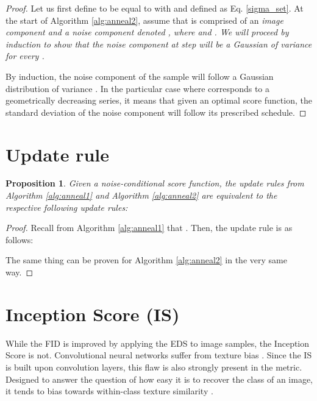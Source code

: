 \documentclass{article} \usepackage{iclr2021_conference_notitle,times}
\theoremstyle{definition}
\theoremstyle{definition}
\newtheorem{proposition}{Proposition}
\begin{document}
\begin{proof}
Let us first define  to be equal to  with  and  defined as Eq. \ref{sigma_set}.
At the start of Algorithm \ref{alg:anneal2}, assume that  is comprised of an \em image component \em and a \em noise component \em denoted , where  and . We will proceed by induction to show that the noise component at step  will be a Gaussian of variance  for every .
\vspace{-0.1cm}

By induction, the noise component of the sample  will follow a Gaussian distribution of variance . In the particular case where  corresponds to a geometrically decreasing series, it means that given an optimal score function, the standard deviation of the noise component will follow its prescribed schedule.
\end{proof}
 
\section{Update rule}
\label{app:update_rule_proof}

\begin{proposition}\label{prop:ff}
\em Given a noise-conditional score function, the update rules from Algorithm \ref{alg:anneal1} and Algorithm \ref{alg:anneal2} are equivalent to the respective following update rules: \em 

\end{proposition}

\begin{proof}
Recall from Algorithm \ref{alg:anneal1} that . Then, the update rule is as follows:


The same thing can be proven for Algorithm \ref{alg:anneal2} in the very same way.
\end{proof}

\section{Inception Score (IS)}\label{sec:is}

While the FID is improved by applying the EDS to image samples, the Inception Score is not.
Convolutional neural networks suffer from texture bias \citep{DBLP:journals/corr/abs-1811-12231}. Since the IS is built upon convolution layers, this flaw is also strongly present in the metric. Designed to answer the question of how easy it is to recover the class of an image, it tends to bias towards within-class texture similarity \citep{ISnote}. 
\end{document}
